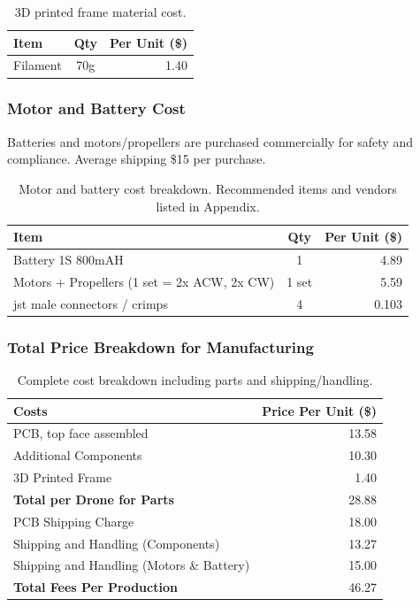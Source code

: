 \begin{table}[H]
\centering
\begin{tabular}{l c r}
\toprule
\textbf{Item} & \textbf{Qty} & \textbf{Per Unit (\$)} \\
\midrule
Filament & 70g & 1.40 \\
\bottomrule
\end{tabular}
\caption{3D printed frame material cost.}
\end{table}

\subsubsection{Motor and Battery Cost}

Batteries and motors/propellers are purchased commercially for safety and compliance. Average shipping \$15 per purchase.

\begin{table}[H]
\centering
\begin{tabular}{l c r}
\toprule
\textbf{Item} & \textbf{Qty} & \textbf{Per Unit (\$)} \\
\midrule
Battery 1S 800mAH & 1 & 4.89 \\
Motors + Propellers (1 set = 2x ACW, 2x CW) & 1 set & 5.59 \\
\gls{jst} male connectors / crimps & 4 & 0.103 \\
\bottomrule
\end{tabular}
\caption{Motor and battery cost breakdown. Recommended items and vendors listed in Appendix.}
\end{table}

\subsubsection{Total Price Breakdown for Manufacturing}

\begin{table}[H]
\centering
\begin{tabular}{l r}
\toprule
\textbf{Costs} & \textbf{Price Per Unit (\$)} \\
\midrule
PCB, top face assembled & 13.58 \\
Additional Components & 10.30 \\
3D Printed Frame & 1.40 \\
\midrule
\textbf{Total per Drone for Parts} & 28.88 \\
PCB Shipping Charge & 18.00 \\
Shipping and Handling (Components) & 13.27 \\
Shipping and Handling (Motors \& Battery) & 15.00 \\
\midrule
\textbf{Total Fees Per Production} & 46.27 \\
\bottomrule
\end{tabular}
\caption{Complete cost breakdown including parts and shipping/handling.}
\end{table}

